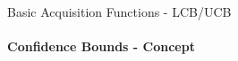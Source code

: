 \begin{frame}[t]{Basic Acquisition Functions - LCB/UCB}
\framesubtitle{Confidence Bounds - Concept}


\end{frame}
